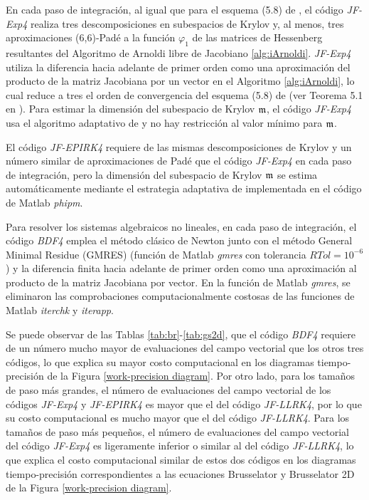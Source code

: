 En cada paso de integración, al igual que para el esquema (5.8) de \cite{hochbruck1998exponential}, el código \textit{JF-Exp4} realiza tres descomposiciones en subespacios de Krylov y, al menos, tres aproximaciones (6,6)-Padé a la función $\varphi_1$ de las matrices de Hessenberg resultantes del Algoritmo de Arnoldi libre de Jacobiano \ref{alg:iArnoldi}. \textit{JF-Exp4} utiliza la diferencia hacia adelante de primer orden como una aproximación del producto de la matriz Jacobiana por un vector en el Algoritmo \ref{alg:iArnoldi}, lo cual reduce a tres el orden de convergencia del esquema (5.8) de \cite{hochbruck1998exponential} (ver Teorema 5.1 en \cite{hochbruck1998exponential}). Para estimar la dimensión del subespacio de Krylov $\mathfrak{m}$, el código \textit{JF-Exp4} usa el algoritmo adaptativo de \cite{hochbruck1998exponential} y no hay restricción al valor mínimo para $\mathfrak{m}$.

El código \textit{JF-EPIRK4} requiere de las mismas descomposiciones de Krylov y un número similar de aproximaciones de Padé que el código \textit{JF-Exp4} en cada paso de integración, pero la dimensión del subespacio de Krylov $\mathfrak{m}$ se estima automáticamente mediante el estrategia adaptativa de \cite{niesen2012algorithm} implementada en el código de Matlab \textit{phipm}.

Para resolver los sistemas algebraicos no lineales, en cada paso de integración, el código \textit{BDF4} emplea el método clásico de Newton junto con el método General Minimal Residue (GMRES) (función de Matlab \textit{gmres} con tolerancia $RTol=10^{-6}$) y la diferencia finita hacia adelante de primer orden como una aproximación al producto de la matriz Jacobiana por vector. En la función de Matlab \textit{gmres}, se eliminaron las comprobaciones computacionalmente costosas de las funciones de Matlab \textit{iterchk} y \textit{iterapp}.


Se puede observar de las Tablas \ref{tab:br}-\ref{tab:gs2d}, que el código \textit{BDF4} requiere de un número mucho mayor de evaluaciones del campo vectorial que los otros tres códigos, lo que explica su mayor costo computacional en los diagramas tiempo-precisión de la Figura \ref{work-precision diagram}. Por otro lado, para los tamaños de paso más grandes, el número de evaluaciones del campo vectorial de los códigos \textit{JF-Exp4} y \textit{JF-EPIRK4} es mayor que el del código \textit{JF-LLRK4}, por lo que su costo computacional es mucho mayor que el del código \textit{JF-LLRK4}. Para los tamaños de paso más pequeños, el número de evaluaciones del campo vectorial del código \textit{JF-Exp4} es ligeramente inferior o similar al del código \textit{JF-LLRK4}, lo que explica el costo computacional similar de estos dos códigos en los diagramas tiempo-precisión correspondientes a las ecuaciones Brusselator y Brusselator 2D de la Figura \ref{work-precision diagram}.

